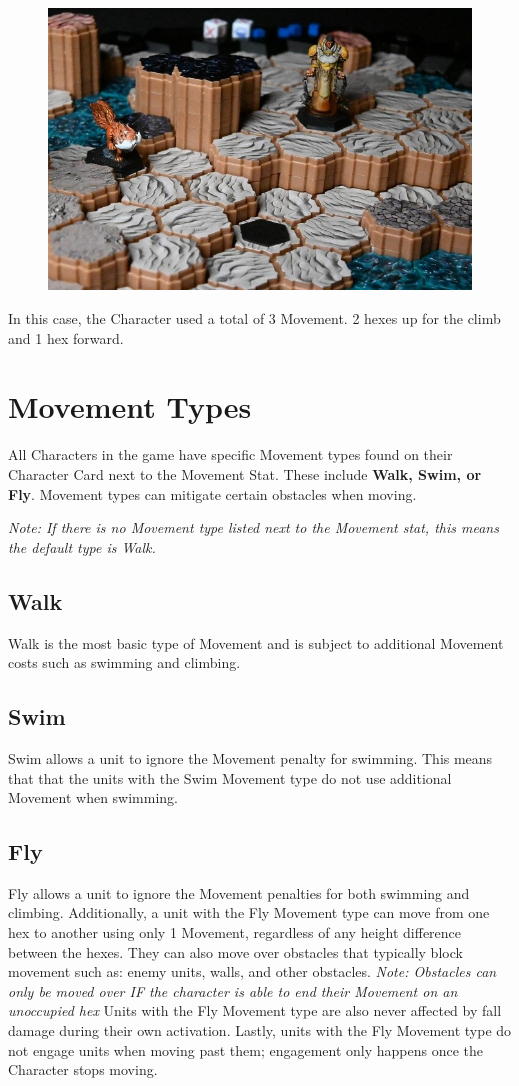 \documentclass[../main.tex]{subfiles}
\begin{document}
\begin{figure}[h]
    \centering
    \includegraphics[width=0.75\linewidth]{chapters//Movement/TimeStrikeClimbing2.jpg}
\end{figure}

In this case, the Character used a total of 3 Movement. 2 hexes up for the climb and 1 hex forward.

\section{Movement Types}
All Characters in the game have specific Movement types found on their Character Card next to the Movement Stat. These include \textbf{Walk, Swim, or Fly}. Movement types can mitigate certain obstacles when moving. 

\textit{Note: If there is no Movement type listed next to the Movement stat, this means the default type is Walk. }
\subsection{Walk}
Walk is the most basic type of Movement and is subject to additional Movement costs such as swimming and climbing.

\subsection{Swim}
Swim allows a unit to ignore the Movement penalty for swimming. This means that that the units with the Swim Movement type do not use additional Movement when swimming. 

\subsection{Fly}
Fly allows a unit to ignore the Movement penalties for both swimming and climbing. Additionally, a unit with the Fly Movement type can move from one hex to another using only 1 Movement, regardless of any height difference between the hexes. They can also move over obstacles that typically block movement such as: enemy units, walls, and other obstacles. \textit{Note: Obstacles can only be moved over IF the character is able to end their Movement on an unoccupied hex} Units with the Fly Movement type are also never affected by fall damage during their own activation. Lastly, units with the Fly Movement type do not engage units when moving past them; engagement only happens once the Character stops moving.
\end{document}
